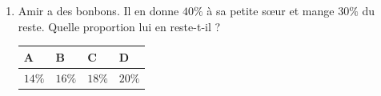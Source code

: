\documentclass[oneside,12pt]{exam}          %
\begin{document}
\begin{enumerate}[resume*]
		

	\item Amir a des bonbons. Il en donne $40\%$ à sa petite sœur et mange $30\%$ du reste. Quelle proportion lui en reste-t-il ?
	
		\hspace{\linewidth-\textwidth}
		\renewcommand{\arraystretch}{1.5}
		\begin{tabular}{| P{0.22\textwidth} | P{0.22\textwidth} | P{0.22\textwidth} | P{0.22\textwidth} |} \hline
			A & B & C & D \\ \hline
			$14\%$ & $16\%$ & $18\%$ & $20\%$ \\ \hline
		\end{tabular}
		
		
		
\end{enumerate}
\end{document}
